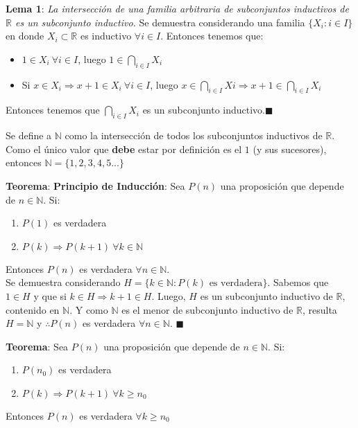 \documentclass[11pt,a4paper]{article}
\newcommand*{\QEDA}{\null\nobreak\hfill\ensuremath{\blacksquare}}
\begin{document}
\noindent \dotfill

\textbf{Lema 1}: \textit{La intersecci\'on de una familia arbitraria de subconjuntos inductivos de $\mathbb{R}$ es un subconjunto inductivo.} Se demuestra considerando una familia $\{ X_i : i \in I \}$ en donde $X_i \subset \mathbb{R}$ es inductivo $\forall i \in I$. Entonces tenemos que:

\begin{itemize}
\item $1 \in X_i\ \forall i \in I$, luego $1 \in \displaystyle{\bigcap_{i \in I}} X_i$
\item Si $x \in X_i \Rightarrow x+1 \in X_i\ \forall i \in I$, luego $x \in \displaystyle{\bigcap_{i \in I} Xi} \Rightarrow x + 1 \in \displaystyle{\bigcap_{i \in I}} X_i$
\end{itemize}
Entonces tenemos que $\displaystyle{\bigcap_{i \in I} X_i}$ es un subconjunto inductivo.\QEDA

\noindent \dotfill

Se define a $\mathbb{N}$ como la intersecci\'on de todos los subconjuntos inductivos de $\mathbb{R}$. Como el \'unico valor que \textbf{debe} estar por definici\'on es el $1$ (y sus sucesores), entonces $\mathbb{N} = \{ 1,2,3,4,5... \}$

\noindent \dotfill

\textbf{Teorema}: \textbf{Principio de Inducci\'on}: Sea $P(n)$ una proposici\'on que depende de $n \in \mathbb{N}$. Si:
\begin{enumerate}
\item $P(1)$ es verdadera
\item $P(k) \Rightarrow P(k+1)\ \forall k \in \mathbb{N}$ 
\end{enumerate}
Entonces $P(n)$ es verdadera $\forall n \in \mathbb{N}$.\\

Se demuestra considerando $H = \{ k \in \mathbb{N} : P(k) \text{ es verdadera} \}$. Sabemos que $1 \in H$ y que si $k \in H \Rightarrow k+1 \in H$. Luego, $H$ es un subconjunto inductivo de $\mathbb{R}$, contenido en $\mathbb{N}$. Y como $\mathbb{N}$ es el menor de subconjunto inductivo de $\mathbb{R}$, resulta $H = \mathbb{N}$ y $\therefore P(n)$ es verdadera $\forall n \in \mathbb{N}$. \QEDA

\noindent \dotfill
\newpage

\textbf{Teorema}: Sea $P(n)$ una proposici\'on que depende de $n \in \mathbb{N}$. Si:
\begin{enumerate}
\item $P(n_0)$ es verdadera
\item $P(k) \Rightarrow P(k+1)\ \forall k \geq n_0$
\end{enumerate}
Entonces $P(n)$ es verdadera $\forall k \geq n_0$\\
\end{document}
